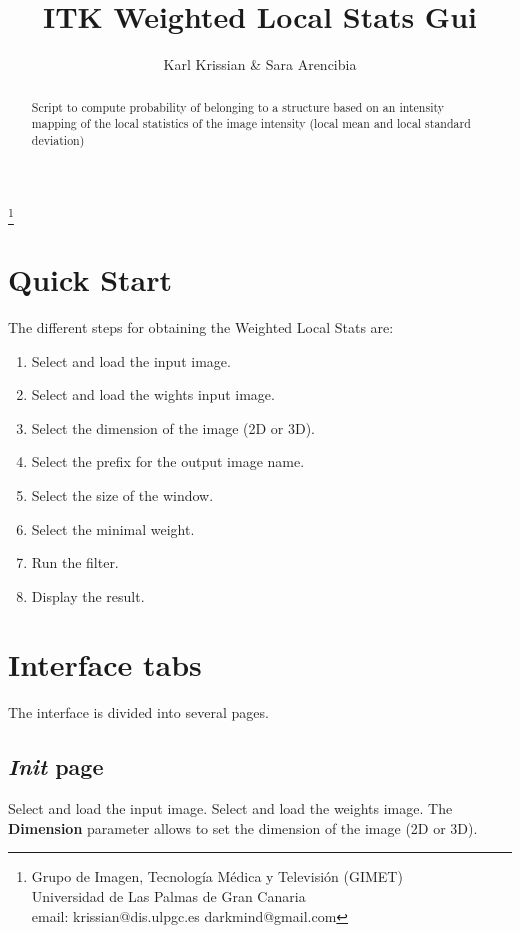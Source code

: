 \documentclass{article}
\begin{document}
\title{ITK Weighted Local Stats Gui}
\author{Karl Krissian \& Sara Arencibia}
\thanks{
Grupo de Imagen, Tecnolog\'ia M\'edica y Televisi\'on (GIMET)\\
Universidad de Las Palmas de Gran Canaria\\
email: krissian@dis.ulpgc.es darkmind@gmail.com
}


\maketitle

\begin{abstract}
Script to compute probability of belonging to a structure based on an intensity mapping of the local statistics of the image intensity (local mean and local standard deviation)
\end{abstract}


\section{Quick Start}

The different steps for obtaining the Weighted Local Stats are:
\begin{enumerate}
  \item Select and load the input image.
  \item Select and load the wights input image.
  \item Select the dimension of the image (2D or 3D).
  \item Select the prefix for the output image name.
  \item Select the size of the window.
  \item Select the minimal weight.
  \item Run the filter.
  \item Display the result.
\end{enumerate}

\section{Interface tabs}

The interface is divided into several pages.

\subsection{\emph{Init} page}

Select and load the input image.
Select and load the weights image.
The {\bf Dimension} parameter allows to set the dimension of the image (2D or 3D).
\end{document}
